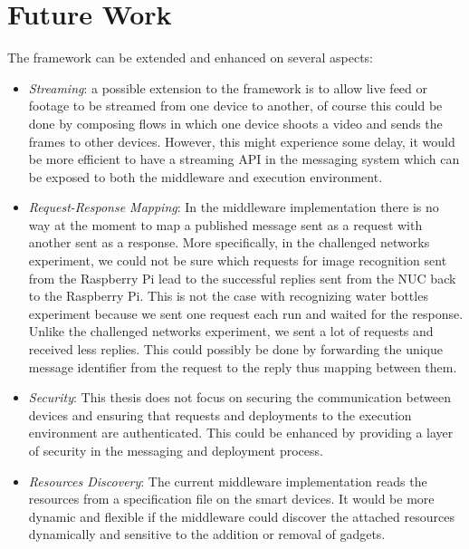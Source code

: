 \section{Future Work}
The framework can be extended and enhanced on several aspects:
\begin{itemize}
\item \textit{Streaming}: a possible extension to the framework is to allow live feed or footage to be streamed from one device to another, of course this could be done by composing flows in which one device shoots a video and sends the frames to other devices. However, this might experience some delay, it would be more efficient to have a streaming API in the messaging system which can be exposed to both the middleware and execution environment.

\item \textit{Request-Response Mapping}: In the middleware implementation there is no way at the moment to map a published message sent as a request  with another sent as a response. More specifically, in the challenged networks experiment, we could not be sure which requests for image recognition sent from the Raspberry Pi lead to the successful  replies  sent from the NUC back to the Raspberry Pi. This is not the case with recognizing water bottles experiment because we sent one request each run and waited for the response. Unlike the challenged networks experiment, we sent a lot of requests and received less replies. This could possibly be done by forwarding the unique message identifier from the request to the reply thus mapping between them.

\item \textit{Security}: This thesis does  not focus on securing the communication between devices and ensuring that requests and deployments to the execution environment are authenticated. This could be enhanced by providing a layer of security in the messaging and deployment process.

\item \textit{Resources Discovery}: The current middleware implementation reads the resources from a specification file on the smart devices. It would be more dynamic and flexible if the middleware could discover the attached resources dynamically and sensitive to the addition or removal of gadgets. 


\end{itemize}
